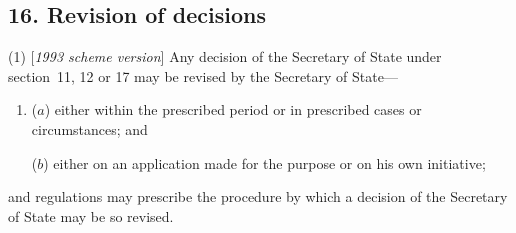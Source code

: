 \documentclass[12pt,a4paper]{article}
\begin{document}
%
%
%
%
%
%
%
%

\subsection{16. Revision of decisions}

(1) [\emph{1993 scheme version}] Any decision of the Secretary of State under section~11, 12 or 17 may be revised by the Secretary of State—
\begin{enumerate}\item[]
($a$) either within the prescribed period or in prescribed cases or circumstances; and

($b$) either on an application made for the purpose or on his own initiative;
\end{enumerate}
and regulations may prescribe the procedure by which a decision of the Secretary of State may be so revised.
\end{document}

